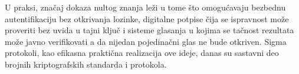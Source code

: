 U praksi, značaj dokaza nultog znanja leži u tome što omogućavaju 
bezbednu autentifikaciju bez otkrivanja lozinke, digitalne potpise 
čija se ispravnost može proveriti bez uvida u tajni ključ i sisteme 
glasanja u kojima se tačnost rezultata može javno verifikovati a da 
nijedan pojedinačni glas ne bude otkriven. Sigma protokoli, kao 
efikasna praktična realizacija ove ideje, danas su sastavni deo 
brojnih kriptografskih standarda i protokola.